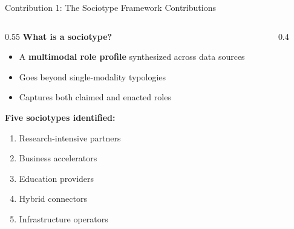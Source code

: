 \documentclass[aspectratio=169]{beamer}
\newcommand{\secmark}[1]{\hfill{\scriptsize\color{gray}#1}}
\begin{document}
\begin{frame}{Contribution 1: The Sociotype Framework}
\secmark{Contributions}
\begin{columns}[T]
\begin{column}{0.55\textwidth}
    \textbf{What is a sociotype?}
    \begin{itemize}
        \item A \textbf{multimodal role profile} synthesized across data sources
        \item Goes beyond single-modality typologies
        \item Captures both claimed and enacted roles
    \end{itemize}
    \vspace{0.5em}
    \textbf{Five sociotypes identified:}
    \begin{enumerate}
        \item Research-intensive partners
        \item Business accelerators
        \item Education providers
        \item Hybrid connectors
        \item Infrastructure operators
    \end{enumerate}
\end{column}
\begin{column}{0.4\textwidth}
    \centering
\end{column}
\end{columns}
\end{frame}
\end{document}

